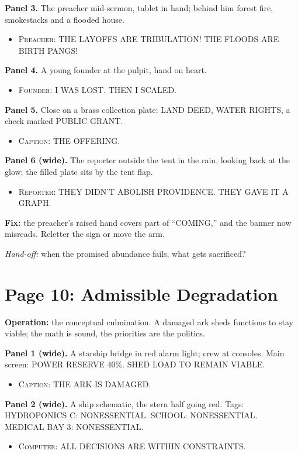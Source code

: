\documentclass[11pt]{article}
\newcommand{\op}[1]{\textbf{Operation:} #1\par}
\newcommand{\panel}[2]{\textbf{#1.} #2\par}
\newenvironment{lines}{\begin{itemize}[label={},leftmargin=1.5em,itemsep=0.05em,topsep=0.1em]}{\end{itemize}}
\newcommand{\say}[2]{\item \textsc{#1}: \textsf{\small #2}}
\newcommand{\fix}[1]{\textcolor{tractred}{\textbf{Fix:}} #1\par}
\newcommand{\handoff}[1]{\emph{Hand-off:} #1\par}
\begin{document}
\panel{Panel 3}{The preacher mid-sermon, tablet in hand; behind him forest fire, smokestacks and a flooded house.}
\begin{lines}\say{Preacher}{THE LAYOFFS ARE TRIBULATION! THE FLOODS ARE BIRTH PANGS!}\end{lines}

\panel{Panel 4}{A young founder at the pulpit, hand on heart.}
\begin{lines}\say{Founder}{I WAS LOST. THEN I SCALED.}\end{lines}

\panel{Panel 5}{Close on a brass collection plate: \textsf{\small LAND DEED}, \textsf{\small WATER RIGHTS}, a check marked \textsf{\small PUBLIC GRANT}.}
\begin{lines}\say{Caption}{THE OFFERING.}\end{lines}

\panel{Panel 6 (wide)}{The reporter outside the tent in the rain, looking back at the glow; the filled plate sits by the tent flap.}
\begin{lines}\say{Reporter}{THEY DIDN'T ABOLISH PROVIDENCE. THEY GAVE IT A GRAPH.}\end{lines}

\fix{the preacher's raised hand covers part of ``COMING,'' and the banner now misreads. Reletter the sign or move the arm.}
\handoff{when the promised abundance fails, what gets sacrificed?}

\section{Page 10: Admissible Degradation}

\op{the conceptual culmination. A damaged ark sheds functions to stay viable; the math is sound, the priorities are the politics.}

\panel{Panel 1 (wide)}{A starship bridge in red alarm light; crew at consoles. Main screen: \textsf{\small POWER RESERVE 40\%. SHED LOAD TO REMAIN VIABLE.}}
\begin{lines}\say{Caption}{THE ARK IS DAMAGED.}\end{lines}

\panel{Panel 2 (wide)}{A ship schematic, the stern half going red. Tags: \textsf{\small HYDROPONICS C: NONESSENTIAL}. \textsf{\small SCHOOL: NONESSENTIAL}. \textsf{\small MEDICAL BAY 3: NONESSENTIAL}.}
\begin{lines}\say{Computer}{ALL DECISIONS ARE WITHIN CONSTRAINTS.}\end{lines}
\end{document}
